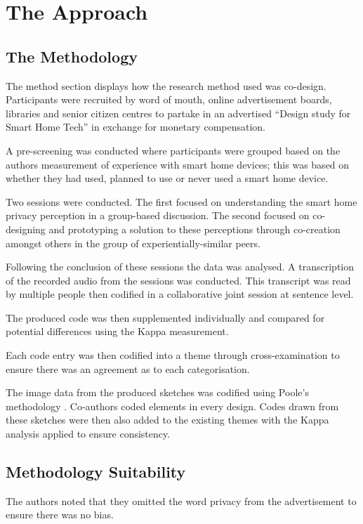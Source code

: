 \section{The Approach}

\subsection{The Methodology}

The method section displays how the research method used was co-design. Participants were recruited by word of mouth, online advertisement boards, libraries and senior citizen centres to partake in an advertised ``Design study for Smart Home Tech'' in exchange for monetary compensation. 

A pre-screening was conducted where participants were grouped based on the authors measurement of experience with smart home devices; this was based on whether they had used, planned to use or never used a smart home device.

Two sessions were conducted. The first focused on understanding the smart home privacy perception in a group-based discussion. The second focused on co-designing and prototyping a solution to these perceptions through co-creation amongst others in the group of experientially-similar peers. 

Following the conclusion of these sessions the data was analysed. A transcription of the recorded audio from the sessions was conducted. This transcript was read by multiple people then codified in a collaborative joint session at sentence level. 

The produced code was then supplemented individually and compared for potential differences using the Kappa measurement. 

Each code entry was then codified into a theme through cross-examination to ensure there was an agreement as to each categorisation.

The image data from the produced sketches was codified using Poole's methodology \cite{Poole:2008:RIU:1409635.1409662}. Co-authors coded elements in every design. 
Codes drawn from these sketches were then also added to the existing themes with the Kappa analysis applied to ensure consistency. 

\subsection{Methodology Suitability}

The authors noted that they omitted the word privacy from the advertisement to ensure there was no bias.

